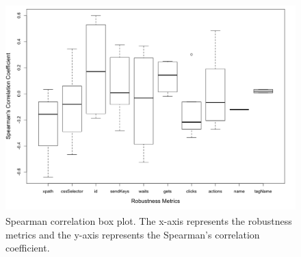 \begin{figure}[ht!] 
\centering     %
\includegraphics[width=14cm,height=8cm]{./Figures/spearman-rq2}
 \captionsetup{justification=justified,
singlelinecheck=false}
\caption{Spearman correlation box plot. The x-axis represents the robustness metrics and the y-axis represents the Spearman's correlation coefficient.}
\label{fig:spearman}
\end{figure} 

